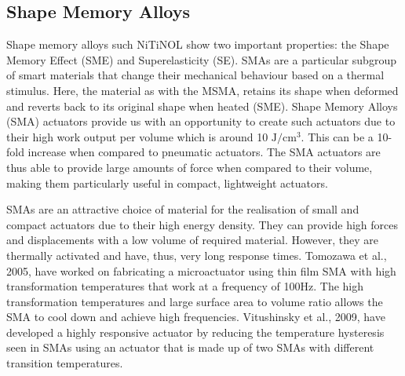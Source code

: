 \subsection{Shape Memory Alloys}
Shape memory alloys such NiTiNOL show two important properties: the Shape Memory Effect (SME) and Superelasticity (SE)\cite{rao_design_2015}. SMAs are a particular subgroup of smart materials that change their mechanical behaviour based on a thermal stimulus. Here, the material as with the MSMA, retains its shape when deformed and reverts back to its original shape when heated (SME). Shape Memory Alloys (SMA) actuators provide us with an opportunity to create such actuators due to their high work output per volume which is around 10 $\mathrm{J}/\mathrm{cm}^3$\cite{mohd_jani_review_2014}. This can be a 10-fold increase when compared to pneumatic actuators. The SMA actuators are thus able to provide large amounts of force when compared to their volume, making them particularly useful in compact, lightweight actuators.

SMAs are an attractive choice of material for the realisation of small and compact actuators due to their high energy density. They can provide high forces and displacements with a low volume of required material. However, they are thermally activated and have, thus, very long response times. Tomozawa et al.\cite{tomozawa2005}, 2005, have worked on fabricating a microactuator using thin film SMA with high transformation temperatures that work at a frequency of 100Hz. The high transformation temperatures and large surface area to volume ratio allows the SMA to cool down and achieve high frequencies. Vitushinsky et al.\cite{vitushinsky_bistable_2009}, 2009, have developed a highly responsive actuator by reducing the temperature hysteresis seen in SMAs using an actuator that is made up of two SMAs with different transition temperatures.

